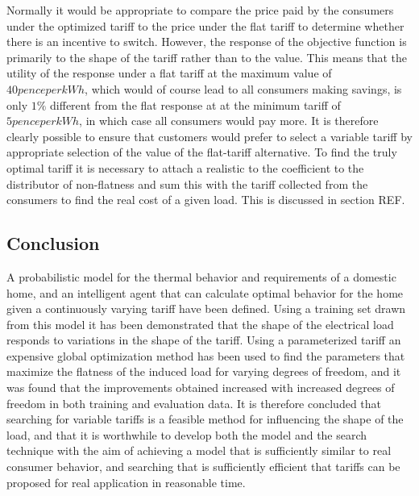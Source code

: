 \documentclass[a4paper, 10 pt, conference]{ieeeconf}  %
\begin{document}
Normally it would be appropriate to compare the price paid by the consumers under the optimized tariff to the price under the flat tariff to determine whether there is an incentive to switch. However, the response of the objective function is primarily to the shape of the tariff rather than to the value. This means that the utility of the response under a flat tariff at the maximum value of $40 pence per kWh$, which would of course lead to all consumers making savings, is only $1\%$ different from the flat response at at the minimum tariff of $5 pence per kWh$, in which case all consumers would pay more. It is therefore clearly possible to ensure that customers would prefer to select a variable tariff by appropriate selection of the value of the flat-tariff alternative. To find the truly optimal tariff it is necessary to attach a realistic to the coefficient to the distributor of non-flatness and sum this with the tariff collected from the consumers to find the real cost of a given load. This is discussed in section REF.

\subsection{Conclusion}
A probabilistic model for the thermal behavior and requirements of a domestic home, and an intelligent agent that can calculate optimal behavior for the home given a continuously varying tariff have been defined. Using a training set drawn from this model it has been demonstrated that the shape of the electrical load responds to variations in the shape of the tariff. Using a parameterized tariff an expensive global optimization method has been used to find the parameters that maximize the flatness of the induced load for varying degrees of freedom, and it was found that the improvements obtained increased with increased degrees of freedom in both training and evaluation data. It is therefore concluded that searching for variable tariffs is a feasible method for influencing the shape of the load, and that it is worthwhile to develop both the model and the search technique with the aim of achieving a model that is sufficiently similar to real consumer behavior, and searching that is sufficiently efficient that tariffs can be proposed for real application in reasonable time. 





\onecolumn
\large
\end{document}
